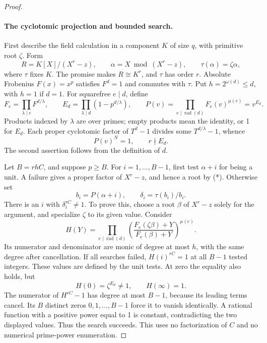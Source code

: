 \documentclass[11pt]{article}
\theoremstyle{definition}
\theoremstyle{remark}
\begin{document}
\begin{proof}
\paragraph{The cyclotomic projection and bounded search.}
First describe the field calculation in a component \(K\) of
size \(q\), with primitive root \(\zeta\). Form
\[
 R=K[X]/(X^r-z),\qquad \alpha=X\bmod(X^r-z),\qquad
 \tau(\alpha)=\zeta\alpha,
\]
where \(\tau\) fixes \(K\). The promise makes \(R\cong K^r\),
and \(\tau\) has order \(r\). Absolute Frobenius \(F(x)=x^p\)
satisfies \(F^d=1\) and commutes with \(\tau\).
Put \(h=2^{\omega(d)}\le d\), with \(h=1\) if \(d=1\).
For squarefree \(e\mid d\), define
\[
 F_e=\prod_{\lambda\mid e}F^{d/\lambda},\qquad
 E_d=\prod_{\lambda\mid d}(1-p^{d/\lambda}),\qquad
 P(v)=\prod_{e\mid\operatorname{rad}(d)}F_e(v)^{\mu(e)}=v^{E_d}.
\]
Products indexed by \(\lambda\) are over primes; empty products
mean the identity, or 1 for \(E_d\). Each proper cyclotomic
factor of \(T^d-1\) divides some \(T^{d/\lambda}-1\), whence
\begin{equation}\label{eq:cofactor-cyclotomic-projection}
                 P(v)^N=1,\qquad r\nmid E_d.
\end{equation}
The second assertion follows from the definition of \(d\).

Let \(B=rhC\), and suppose \(p\ge B\). For
\(i=1,\ldots,B-1\), first test \(\alpha+i\) for being a unit.
A failure gives a proper factor of \(X^r-z\), and hence a root
by (*). Otherwise set
\[
 b_i=P(\alpha+i),\qquad \delta_i=\tau(b_i)/b_i.
\]
There is an \(i\) with \(\delta_i^{rC}\ne1\).
To prove this, choose a root \(\beta\) of \(X^r-z\) solely
for the argument, and specialize \(\zeta\) to its given value.
Consider
\[
 H(Y)=\prod_{e\mid\operatorname{rad}(d)}
 \left(\frac{F_e(\zeta\beta)+Y}{F_e(\beta)+Y}\right)^{\mu(e)}.
\]
Its numerator and denominator are monic of degree at most \(h\),
with the same degree after cancellation. If all searches failed,
\(H(i)^{rC}=1\) at all \(B-1\) tested integers. These values
are defined by the unit tests. At zero the equality also holds,
but
\[
                     H(0)=\zeta^{E_d}\ne1,
                     \qquad H(\infty)=1.
\]
The numerator of \(H^{rC}-1\) has degree at most \(B-1\),
because its leading terms cancel. Its \(B\) distinct zeros
\(0,1,\ldots,B-1\) force it to vanish identically. A rational
function with a positive power equal to 1 is constant, contradicting
the two displayed values. Thus the search succeeds. This uses no
factorization of \(C\) and no numerical prime-power enumeration.


\end{proof}
\end{document}
